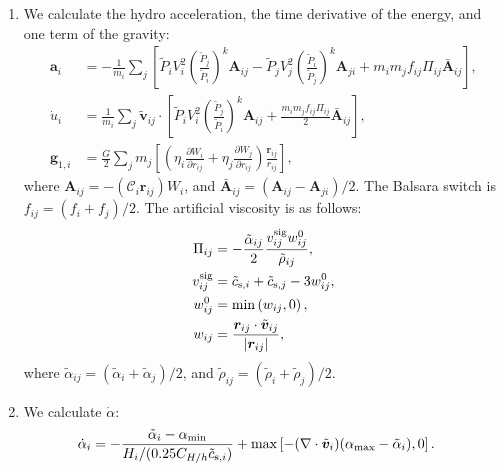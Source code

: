 \documentclass[fleqn,dvipdfmx]{article}
\begin{document}
\begin{enumerate}
\item We calculate the hydro acceleration, the time derivative of the
  energy, and one term of the gravity:
  \begin{align}
    \bm{a}_i &= - \frac{1}{m_i} \sum_j \left[ \tilde{P}_i V_i^2 \left(
      \frac{\tilde{P}_j}{\tilde{P}_i} \right)^k \bm{A}_{ij} -
      \tilde{P}_j V_j^2 \left( \frac{\tilde{P}_i}{\tilde{P}_j}
      \right)^k \bm{A}_{ji} + m_i m_j f_{ij} \Pi_{ij}
      \bar{\bm{A}}_{ij} \right], \\
    \dot{u}_i &= \frac{1}{m_i} \sum_j \tilde{\bm{v}}_{ij} \cdot \left[
      \tilde{P}_i V_i^2 \left( \frac{\tilde{P}_j}{\tilde{P}_i}
      \right)^k \bm{A}_{ij} + \frac{m_i m_j f_{ij} \Pi_{ij}}{2}
      \bar{\bm{A}}_{ij} \right], \\
    \bm{g}_{1,i} &= \frac{G}{2} \sum_j m_j \left[ \left( \eta_i
      \frac{\partial W_{i}}{\partial r_{ij}} + \eta_j \frac{\partial
        W_{j}}{\partial r_{ij}} \right) \frac{\bm{r}_{ij}}{r_{ij}}
      \right],
\end{align}
  where $\bm{A}_{ij}=- \left( \mathcal{C}_i \bm{r}_{ij} \right) W_i$,
  and $\bar{\bm{A}}_{ij}=\left( \bm{A}_{ij} - \bm{A}_{ji}
  \right)/2$. The Balsara switch is $f_{ij} = (f_i + f_j)/2$. The
  artificial viscosity is as follows:
  \begin{align}
    \Pi_{ij} &= - \frac{\tilde{\alpha}_{ij}}{2} \frac{v_{ij}^{\rm sig}
      w_{ij}^0}{\tilde{\rho}_{ij}}, \\
    v_{ij}^{\rm sig} &= \tilde{c}_{{\rm s},i} + \tilde{c}_{{\rm s},j}
    - 3w_{ij}^0, \\
    w_{ij}^0 &= \min \left(w_{ij},0\right), \\
    w_{ij} &= \frac{\bm{r}_{ij} \cdot
      \tilde{\bm{v}}_{ij}}{|\bm{r}_{ij}|},
  \end{align}
  where $\tilde{\alpha}_{ij}=(\tilde{\alpha}_i+\tilde{\alpha}_j)/2$,
  and $\tilde{\rho}_{ij}=(\tilde{\rho}_i+\tilde{\rho}_j)/2$.

\item We calculate $\dot{\alpha}$:
  \begin{align}
    \dot{\alpha}_i &= - \frac{\tilde{\alpha}_i - \alpha_{\rm
        min}}{H_i/(0.25C_{H/h}\tilde{c}_{{\rm s},i})} + \max \left[
      -(\nabla \cdot \tilde{\bm{v}}_i)(\alpha_{\rm
        max}-\tilde{\alpha}_i), 0 \right].
  \end{align}


\end{enumerate}
\end{document}
